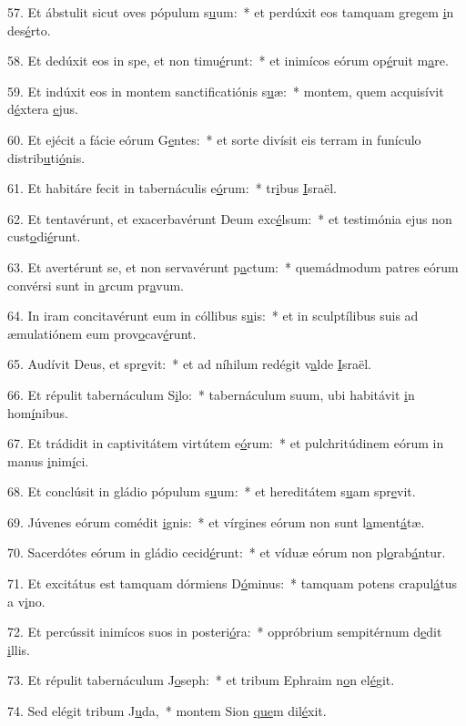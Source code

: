 57. Et ábstulit sicut oves pópulum s\uline{u}um:~* et perdúxit eos tamquam gregem \uline{i}n des\uline{é}rto.\par 
58. Et dedúxit eos in spe, et non timu\uline{é}runt:~* et inimícos eórum op\uline{é}ruit m\uline{a}re.\par 
59. Et indúxit eos in montem sanctificatiónis s\uline{u}æ:~* montem, quem acquisívit d\uline{é}xtera \uline{e}jus.\par 
60. Et ejécit a fácie eórum G\uline{e}ntes:~* et sorte divísit eis terram in funículo distrib\uline{u}ti\uline{ó}nis.\par 
61. Et habitáre fecit in tabernáculis e\uline{ó}rum:~* tr\uline{i}bus \uline{I}sraël.\par 
62. Et tentavérunt, et exacerbavérunt Deum exc\uline{é}lsum:~* et testimónia ejus non cust\uline{o}di\uline{é}runt.\par 
63. Et avertérunt se, et non servavérunt p\uline{a}ctum:~* quemádmodum patres eórum convérsi sunt in \uline{a}rcum pr\uline{a}vum.\par 
64. In iram concitavérunt eum in cóllibus s\uline{u}is:~* et in sculptílibus suis ad æmulatiónem eum prov\uline{o}cav\uline{é}runt.\par 
65. Audívit Deus, et spr\uline{e}vit:~* et ad níhilum redégit v\uline{a}lde \uline{I}sraël.\par 
66. Et répulit tabernáculum S\uline{i}lo:~* tabernáculum suum, ubi habitávit \uline{i}n hom\uline{í}nibus.\par 
67. Et trádidit in captivitátem virtútem e\uline{ó}rum:~* et pulchritúdinem eórum in manus \uline{i}nim\uline{í}ci.\par 
68. Et conclúsit in gládio pópulum s\uline{u}um:~* et hereditátem s\uline{u}am spr\uline{e}vit.\par 
69. Júvenes eórum comédit \uline{i}gnis:~* et vírgines eórum non sunt l\uline{a}ment\uline{á}tæ.\par 
70. Sacerdótes eórum in gládio cecid\uline{é}runt:~* et víduæ eórum non pl\uline{o}rab\uline{á}ntur.\par 
71. Et excitátus est tamquam dórmiens D\uline{ó}minus:~* tamquam potens crapul\uline{á}tus a v\uline{i}no.\par 
72. Et percússit inimícos suos in posteri\uline{ó}ra:~* oppróbrium sempitérnum d\uline{e}dit \uline{i}llis.\par 
73. Et répulit tabernáculum J\uline{o}seph:~* et tribum Ephraim n\uline{o}n el\uline{é}git.\par 
74. Sed elégit tribum J\uline{u}da,~* montem Sion \uline{que}m dil\uline{é}xit.\par 
